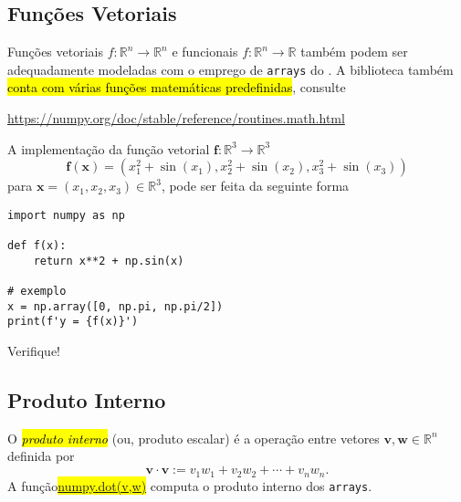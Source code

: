 \subsection{Funções Vetoriais}

Funções vetoriais $f:\mathbb{R}^n\to\mathbb{R}^n$ e funcionais $f:\mathbb{R}^n\to\mathbb{R}$ também podem ser adequadamente modeladas com o emprego de \lstinline+arrays+ do \hl{{\numpy}}. A biblioteca também \hl{conta com várias funções matemáticas predefinidas}, consulte
\begin{center}
  \url{https://numpy.org/doc/stable/reference/routines.math.html}
\end{center}

\begin{ex}
  A implementação da função vetorial $\pmb{f}:\mathbb{R}^3\to\mathbb{R}^3$
  \begin{equation}
    \pmb{f}(\pmb{x}) = (x_1^2+\sin(x_1), x_2^2+\sin(x_2), x_3^2+\sin(x_3))
  \end{equation}
  para $\pmb{x} = (x_1, x_2, x_3)\in\mathbb{R}^3$, pode ser feita da seguinte forma
\begin{lstlisting}
import numpy as np

def f(x):
    return x**2 + np.sin(x)

# exemplo
x = np.array([0, np.pi, np.pi/2])
print(f'y = {f(x)}')
\end{lstlisting}
  Verifique!
\end{ex}

\subsection{Produto Interno}

O \hl{\emph{produto interno}} (ou, produto escalar) é a operação entre vetores $\pmb{v},\pmb{w}\in\mathbb{R}^n$ definida por
\begin{equation}
  \pmb{v}\cdot\pmb{v} := v_1w_1+v_2w_2+\cdots+v_nw_n.
\end{equation}
A função\hl{{\href{https://numpy.org/doc/stable/reference/generated/numpy.dot.html}{numpy.dot(v,w)}}} computa o produto interno dos \lstinline+arrays+.

